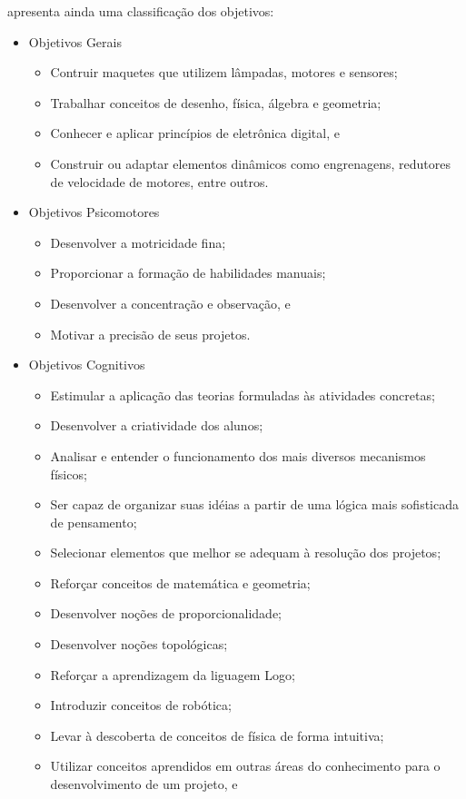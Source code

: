 \cite{zilli2004robotica} apresenta ainda uma classificação dos objetivos:
\begin{itemize}
\item Objetivos Gerais
\begin{itemize}
\item Contruir maquetes que utilizem lâmpadas, motores e sensores;
\item Trabalhar conceitos de desenho, física, álgebra e geometria;
\item Conhecer e aplicar princípios de eletrônica digital, e
\item Construir ou adaptar elementos dinâmicos como engrenagens, redutores de velocidade de motores, entre outros.
\end{itemize}
\item Objetivos Psicomotores
\begin{itemize}
\item Desenvolver a motricidade fina;
\item Proporcionar a formação de habilidades manuais;
\item Desenvolver a concentração e observação, e
\item Motivar a precisão de seus projetos.
\end{itemize}
\item Objetivos Cognitivos
\begin{itemize}
\item Estimular a aplicação das teorias formuladas às atividades concretas;
\item Desenvolver a criatividade dos alunos;
\item Analisar e entender o funcionamento dos mais diversos mecanismos físicos;
\item Ser capaz de organizar suas idéias a partir de uma lógica mais sofisticada de pensamento;
\item Selecionar elementos que melhor se adequam à resolução dos projetos;
\item Reforçar conceitos de matemática e geometria;
\item Desenvolver noções de proporcionalidade;
\item Desenvolver noções topológicas;
\item Reforçar a aprendizagem da liguagem Logo;
\item Introduzir conceitos de robótica;
\item Levar à descoberta de conceitos de física de forma intuitiva;
\item Utilizar conceitos aprendidos em outras áreas do conhecimento para o desenvolvimento de um projeto, e

\end{itemize}
\end{itemize}
